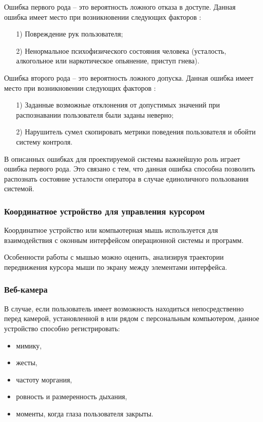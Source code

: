 Ошибка первого рода -- это вероятность ложного отказа в доступе. Данная ошибка имеет место при возникновении следующих факторов \cite{keystroke}: 
\begin{itemize}[leftmargin=1.6\parindent]
\item[1)] Повреждение рук пользователя;
\item[2)] Ненормальное психофизического состояния человека (усталость, алкогольное или наркотическое опьянение, приступ гнева).
\end{itemize}

Ошибка второго рода -- это вероятность ложного допуска. Данная ошибка имеет место при возникновении следующих факторов \cite{keystroke}:
\begin{itemize}[leftmargin=1.6\parindent]
\item[1)] Заданные возможные отклонения от допустимых значений при распознавании пользователя были заданы неверно;
\item[2)] Нарушитель сумел скопировать метрики поведения пользователя и обойти систему контроля.
\end{itemize}

В описанных ошибках для проектируемой системы важнейшую роль играет ошибка первого рода. Это связано с тем, что данная ошибка способна позволить распознать состояние усталости оператора в случае единоличного пользования системой.

\subsubsection{Координатное устройство для управления курсором}
Координатное устройство или компьютерная мышь используется для взаимодействия с оконным интерфейсом операционной системы и программ.

Особенности работы с мышью можно оценить, анализируя траектории передвижения курсора мыши по экрану между элементами интерфейса. \cite{recognitionOfPsycho}

\cite{mouseMethod}

\subsubsection{Веб-камера}
В случае, если пользователь имеет возможность находиться непосредственно перед камерой, установленной в или рядом с персональным компьютером, данное устройство способно регистрировать:

\begin{itemize}
\item мимику,
\item жесты,
\item частоту моргания,
\item ровность и размеренность дыхания,
\item моменты, когда глаза пользователя закрыты.
\end{itemize}

